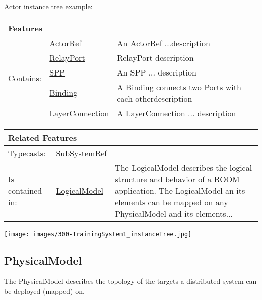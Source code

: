				Actor instance tree example:
			
			
			\begingroup
			\renewcommand{\arraystretch}{1.8} %
			\begin{longtable}{p{2.5cm}|p{4cm} p{}}
				\multicolumn{2}{l}{\textbf{\large Features}} & \\
				\hline
			\multirow{5}{*}{Contains:} & \tabitem \hyperlink{ref:ActorRef}{ActorRef}  & An ActorRef ...description\\
			& \tabitem \hyperlink{ref:RelayPort}{RelayPort}  & RelayPort description \\
			& \tabitem \hyperlink{ref:SPP}{SPP}  & An SPP ... description \\
			& \tabitem \hyperlink{ref:Binding}{Binding}  & A Binding connects two Ports with each otherdescription \\
			& \tabitem \hyperlink{ref:LayerConnection}{LayerConnection}  & A LayerConnection ... description  \\
			\hline
			\end{longtable}
			\endgroup
			
			\begingroup
			\renewcommand{\arraystretch}{1.8} %
			\begin{longtable}{p{2.5cm}|p{4cm} p{}}
				\multicolumn{2}{l}{\textbf{\large Related Features}} & \\
				\hline
			Typecasts: & \tabitem \hyperlink{ref:SubSystemRef}{SubSystemRef}  & \\
			\hline
			Is contained in: & \tabitem \hyperlink{ref:LogicalModel}{LogicalModel}  & The LogicalModel describes the logical structure and behavior of a ROOM application. The LogicalModel an its elements can be mapped on any PhysicalModel and its elements...\\
			\hline
			\end{longtable}
			\endgroup
			
			\texttt{[image: images/300-TrainingSystem1\_instanceTree.jpg]}
			
			
		\vspace{\baselineskip}
		\vspace{\baselineskip}
		\vspace{\baselineskip}
		\subsection{\huge PhysicalModel}
		The PhysicalModel describes the topology of the targets a distributed system can be deployed (mapped) on.
	
